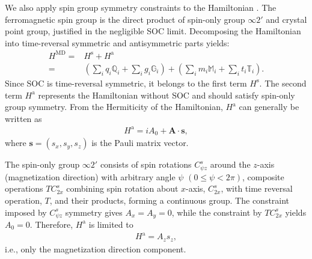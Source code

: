 \documentclass[preprint,12pt]{elsarticle}
\begin{document}
We also apply spin group symmetry constraints to the Hamiltonian
\cite{Liu2022-hy, Chen2025-py, Liu2025-af}.
The ferromagnetic spin group is the direct product of spin-only group
$\infty 2'$ and crystal point group, justified in the negligible SOC limit.
Decomposing the Hamiltonian into time-reversal symmetric and
antisymmetric parts yields:
\begin{align}
  H^{\mathrm{MD}}
  = & H^{\mathrm{s}} + H^{\mathrm{a}} \nonumber                            \\
  = & \left( \sum_{i} q_i \mathbb{Q}_i + \sum_{i} g_i \mathbb{G}_i \right)
  + \left( \sum_{i} m_i \mathbb{M}_i + \sum_{i} t_i \mathbb{T}_i
  \right). \label{eq:ham_decomp}
\end{align}
Since SOC is time-reversal symmetric, it belongs to the first term
$H^{\mathrm{s}}$. The second term $H^{\mathrm{a}}$ represents the
Hamiltonian without SOC and should satisfy spin-only group symmetry.
From the Hermiticity of the Hamiltonian, $H^{\mathrm{a}}$ can
generally be written as
\begin{align}
  H^{\mathrm{a}} = i A_0 + \bm{A} \cdot \bm{s}, \label{eq:ham_asym}
\end{align}
where $\bm{s} = (s_x, s_y, s_z)$ is the Pauli matrix vector.

The spin-only group $\infty 2'$ consists of spin rotations $C^s_{\psi
z}$ around the $z$-axis (magnetization direction) with arbitrary
angle $\psi$ $(0 \leq \psi < 2\pi)$, composite operations $T
C^s_{2x}$ combining spin rotation about $x$-axis, $C^s_{2x}$, with
time reversal operation, $T$, and their products, forming a continuous group.
The constraint imposed by $C^s_{\psi z}$ symmetry gives
$A_x = A_y = 0$,
while the constraint by $T C^s_{2x}$ yields
$A_0 = 0$.
Therefore, $H^{\mathrm{a}}$ is limited to
\begin{align}
  H^{\mathrm{a}} = A_z s_z,
\end{align}
i.e., only the magnetization direction component.
\end{document}
